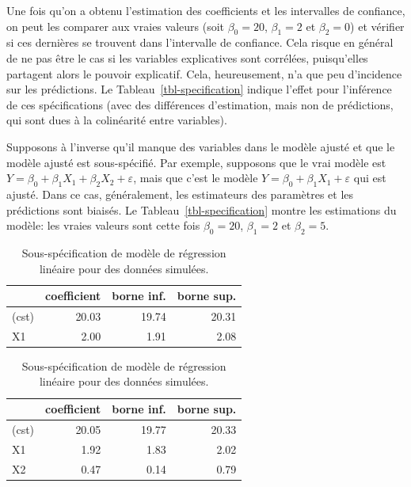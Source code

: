 \documentclass[
  11pt,
  letterpaper,
]{scrbook}
\theoremstyle{definition}
\theoremstyle{remark}
\begin{document}
Une fois qu'on a obtenu l'estimation des coefficients et les intervalles
de confiance, on peut les comparer aux vraies valeurs (soit
\(\beta_0 = 20\), \(\beta_1=2\) et \(\beta_2 = 0\)) et vérifier si ces
dernières se trouvent dans l'intervalle de confiance. Cela risque en
général de ne pas être le cas si les variables explicatives sont
corrélées, puisqu'elles partagent alors le pouvoir explicatif. Cela,
heureusement, n'a que peu d'incidence sur les prédictions. Le
Tableau~\ref{tbl-specification} indique l'effet pour l'inférence de ces
spécifications (avec des différences d'estimation, mais non de
prédictions, qui sont dues à la colinéarité entre variables).

Supposons à l'inverse qu'il manque des variables dans le modèle ajusté
et que le modèle ajusté est sous-spécifié. Par exemple, supposons que le
vrai modèle est \(Y=\beta_0+\beta_1X_1+\beta_2X_2+\varepsilon\), mais
que c'est le modèle \(Y=\beta_0+\beta_1X_1+\varepsilon\) qui est ajusté.
Dans ce cas, généralement, les estimateurs des paramètres et les
prédictions sont biaisés. Le Tableau~\ref{tbl-specification} montre les
estimations du modèle: les vraies valeurs sont cette fois
\(\beta_0=20\), \(\beta_1 = 2\) et \(\beta_2 = 5\).

\begin{table}

\caption{\label{tbl-specification2}Sous-spécification de modèle de
régression linéaire pour des données
simulées.}\begin{minipage}[t]{\linewidth}

{\centering 

\centering
\begin{tabular}[t]{lrrr}
\toprule
  & coefficient & borne inf. & borne sup.\\
\midrule
(cst) & 20.03 & 19.74 & 20.31\\
X1 & 2.00 & 1.91 & 2.08\\
\bottomrule
\end{tabular}

}

\end{minipage}%
\newline
\begin{minipage}[t]{\linewidth}

{\centering 

\centering
\begin{tabular}[t]{lrrr}
\toprule
  & coefficient & borne inf. & borne sup.\\
\midrule
(cst) & 20.05 & 19.77 & 20.33\\
X1 & 1.92 & 1.83 & 2.02\\
X2 & 0.47 & 0.14 & 0.79\\
\bottomrule
\end{tabular}

}

\end{minipage}%

\end{table}
\end{document}

